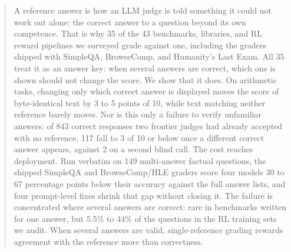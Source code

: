 \documentclass{article}
\begin{document}
\begin{abstract}
A reference answer is how an LLM judge is told something it could not work out alone: the correct answer to a question beyond its own competence. That is why 35 of the 43 benchmarks, libraries, and RL reward pipelines we surveyed grade against one, including the graders shipped with SimpleQA, BrowseComp, and Humanity's Last Exam. All 35 treat it as an answer key: when several answers are correct, which one is shown should not change the score. We show that it does. On arithmetic tasks, changing only which correct answer is displayed moves the score of byte-identical text by 3 to 5 points of 10, while text matching neither reference barely moves. Nor is this only a failure to verify unfamiliar answers: of 843 correct responses two frontier judges had already accepted with no reference, 117 fall to 3 of 10 or below once a different correct answer appears, against 2 on a second blind call. The cost reaches deployment. Run verbatim on 149 multi-answer factual questions, the shipped SimpleQA and BrowseComp/HLE graders score four models 30 to 67 percentage points below their accuracy against the full answer lists, and four prompt-level fixes shrink that gap without closing it. The failure is concentrated where several answers are correct: rare in benchmarks written for one answer, but 5.5\% to 44\% of the questions in the RL training sets we audit. When several answers are valid, single-reference grading rewards agreement with the reference more than correctness.
\end{abstract}
\end{document}
